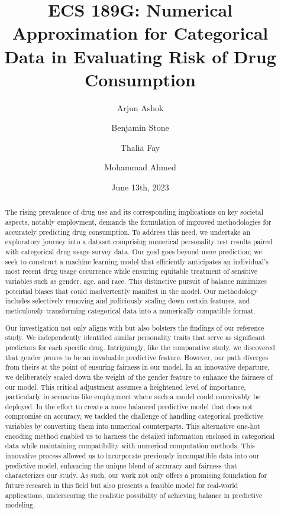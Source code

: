 \documentclass{article}
\title{ECS 189G: Numerical Approximation for Categorical Data in Evaluating Risk of Drug Consumption}
\author[$\S\dag$]{Arjun Ashok}
\author[$\S$]{Benjamin Stone}
\author[$\S$]{Thalia Fay}
\author[$\S$]{Mohammad Ahmed}
\affil[$\S$]{College of Letters \& Sciences, University of California, Davis, Davis, CA}
\affil[$\dag$]{Corresponding Author, arjun3.ashok@gmail.com}
\date{June 13th, 2023}
\begin{document}
\maketitle

\begin{abstract}
The rising prevalence of drug use and its corresponding implications on key societal aspects, notably employment, demands the formulation of improved methodologies for accurately predicting drug consumption. To address this need, we undertake an exploratory journey into a dataset comprising numerical personality test results paired with categorical drug usage survey data. Our goal goes beyond mere prediction; we seek to construct a machine learning model that efficiently anticipates an individual's most recent drug usage occurrence while ensuring equitable treatment of sensitive variables such as gender, age, and race. This distinctive pursuit of balance minimizes potential biases that could inadvertently manifest in the model. Our methodology includes selectively removing and judiciously scaling down certain features, and meticulously transforming categorical data into a numerically compatible format.


Our investigation not only aligns with but also bolsters the findings of our reference study. We independently identified similar personality traits that serve as significant predictors for each specific drug. Intriguingly, like the comparative study, we discovered that gender proves to be an invaluable predictive feature. However, our path diverges from theirs at the point of ensuring fairness in our model. In an innovative departure, we deliberately scaled down the weight of the gender feature to enhance the fairness of our model. This critical adjustment assumes a heightened level of importance, particularly in scenarios like employment where such a model could conceivably be deployed. In the effort to create a more balanced predictive model that does not compromise on accuracy, we tackled the challenge of handling categorical predictive variables by converting them into numerical counterparts. This alternative one-hot encoding method enabled us to harness the detailed information enclosed in categorical data while maintaining compatibility with numerical computation methods. This innovative process allowed us to incorporate previously incompatible data into our predictive model, enhancing the unique blend of accuracy and fairness that characterizes our study. As such, our work not only offers a promising foundation for future research in this field but also presents a feasible model for real-world applications, underscoring the realistic possibility of achieving balance in predictive modeling.

\end{abstract}
\end{document}
